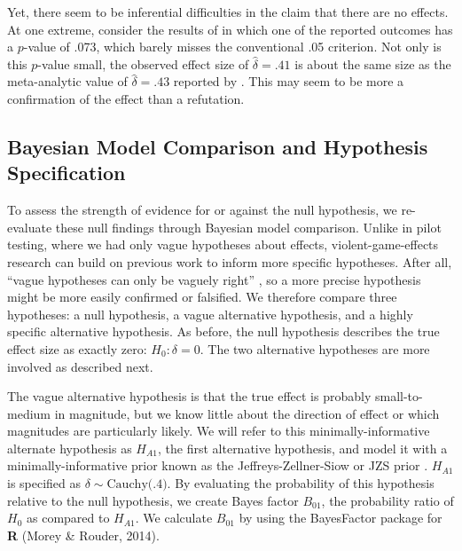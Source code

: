 \documentclass[man]{apa6}
\begin{document}
Yet, there seem to be inferential difficulties in the claim that there are no effects.  At one extreme, consider the results of \citet{Elson:etal:2013} in which one of the reported outcomes has a $p$-value of .073, which barely misses the conventional .05 criterion.  Not only is this $p$-value small, the observed effect size of $\hat{\delta}=.41$ is about the same size as the meta-analytic value of $\hat{\delta}=.43$ reported by \citet{Anderson:etal:2010}.  This may seem to be more a confirmation of the effect than a refutation.

\subsection{Bayesian Model Comparison and Hypothesis Specification}
To assess the strength of evidence for or against the null hypothesis, we re-evaluate these null findings through Bayesian model comparison. Unlike in pilot testing, where we had only vague hypotheses about effects, violent-game-effects research can build on previous work to inform more specific hypotheses. After all, ``vague hypotheses can only be vaguely right'' \citep[p. 4]{Gallistel:2009}, so a more precise hypothesis might be more easily confirmed or falsified. We therefore compare three hypotheses: a null hypothesis, a vague alternative hypothesis, and a highly specific alternative hypothesis. As before, the null hypothesis describes the true effect size as exactly zero: $H_0: \delta = 0$. The two alternative hypotheses are more involved as described next. 

The vague alternative hypothesis is that the true effect is probably small-to-medium in magnitude, but we know little about the direction of effect or which magnitudes are particularly likely. We will refer to this minimally-informative alternate hypothesis as $H_{A1}$, the first alternative hypothesis, and model it with a minimally-informative prior known as the Jeffreys-Zellner-Siow or JZS prior \citep[see ][]{Jeffreys:1961,Liang:etal:2008,Rouder:etal:2009a,Zellner:Siow:1980}. %
$H_{A1}$ is specified as $\delta \sim \mbox{Cauchy(.4)}$. By evaluating the probability of this hypothesis relative to the null hypothesis, we create Bayes factor $B_{01}$, the probability ratio of $H_0$ as compared to $H_{A1}$. We calculate $B_{01}$ by using the BayesFactor package for \textbf{R} (Morey \& Rouder, 2014).  
\end{document}

